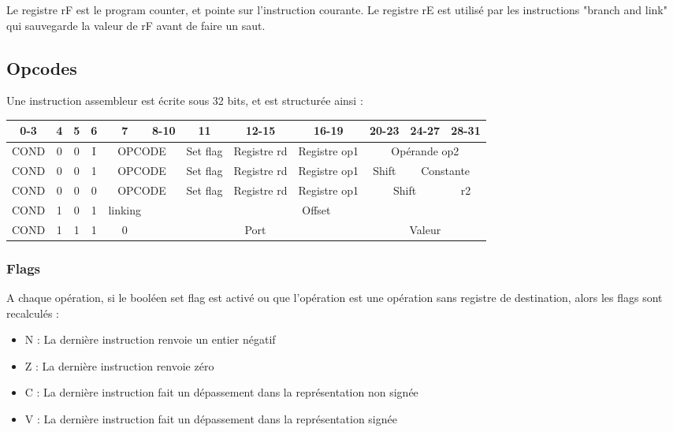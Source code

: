\documentclass[a4paper]{article}
\begin{document}
Le registre rF est le program counter, et pointe sur l'instruction courante.
Le registre rE est utilisé par les instructions "branch and link" qui sauvegarde
la valeur de rF avant de faire un saut.

\subsection{Opcodes}

Une instruction assembleur est écrite sous 32 bits, et est structurée ainsi :

\begin{tabular}{|c|c|c|c|c|c|c|c|c|c|c|c|}
  \hline
  0-3  & 4 & 5 & 6 & 7 & 8-10 & 11 & 12-15 & 16-19 & 20-23 & 24-27 & 28-31 \\
  \hline
  COND & 0 & 0 & I & \multicolumn{2}{c|}{OPCODE} & Set flag & Registre rd & Registre op1 & \multicolumn{3}{c|}{Opérande op2}  \\
  \hline
  COND & 0 & 0 & 1 & \multicolumn{2}{c|}{OPCODE} & Set flag & Registre rd &Registre op1 & Shift & \multicolumn{2}{c|}{Constante} \\
  \hline
  COND & 0 & 0 & 0 & \multicolumn{2}{c|}{OPCODE} & Set flag & Registre rd & Registre op1 & \multicolumn{2}{c|}{Shift} & r2  \\
  \hline
  COND & 1 & 0 & 1 & linking & \multicolumn{ 7}{c|}{Offset} \\
  \hline
  COND & 1 & 1 & 1 & 0 & \multicolumn{4}{c|}{Port} & \multicolumn{3}{c|}{Valeur} \\
  \hline
\end{tabular}

\subsubsection{Flags}

A chaque opération, si le booléen set flag est activé ou que l'opération est une opération sans registre de destination, alors les flags sont
recalculés :
  \begin{itemize}
  \item N : La dernière instruction renvoie un entier négatif
  \item Z : La dernière instruction renvoie zéro
  \item C : La dernière instruction fait un dépassement dans la représentation
    non signée
  \item V : La dernière instruction fait un dépassement dans la représentation
    signée
  \end{itemize}
\end{document}
